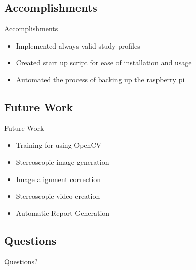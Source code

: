 \documentclass[17pt, aspectratio=169]{beamer}
\begin{document}
\subsection{Accomplishments}
\begin{frame}{Accomplishments}
	\begin{itemize}
		\item Implemented always valid study profiles
		\item Created start up script for ease of installation and usage
		\item Automated the process of backing up the raspberry pi
	\end{itemize}
\end{frame}
\subsection*{Future Work}
\begin{frame}{Future Work}
	\begin{itemize}
		\item Training for using OpenCV
		\item Stereoscopic image generation
		\item Image alignment correction
		\item Stereoscopic video creation
		\item Automatic Report Generation
	\end{itemize}
\end{frame}
\subsection*{Questions}
\begin{frame}
	\begin{center}
		\begin{huge}
			Questions?
		\end{huge}
	\end{center}
\end{frame}
\end{document}
